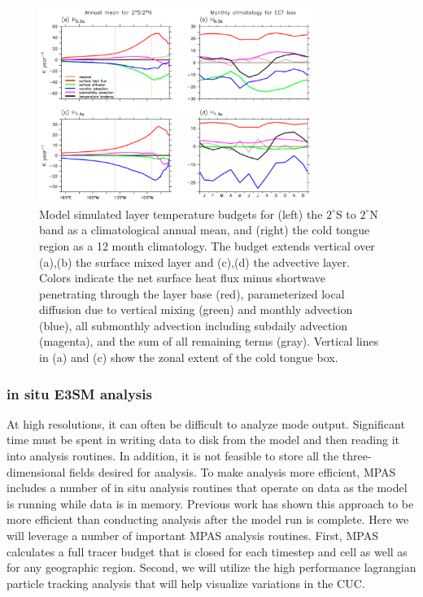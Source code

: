 \begin{figure}[h]
  \centering
  \includegraphics[width=0.8\textwidth]{heatBudget.pdf}
  \caption{Model simulated layer temperature budgets for (left) the $2^\circ$S to $2^\circ$N band as a climatological annual mean, and (right) the cold tongue region as a 12 month climatology.  The budget extends vertical over (a),(b) the surface mixed layer and (c),(d) the advective layer.  Colors indicate the net surface heat flux minus shortwave penetrating through the layer base (red), parameterized local diffusion due to vertical mixing (green) and monthly advection (blue), all submonthly advection including subdaily advection (magenta), and the sum of all remaining terms (gray).  Vertical lines in (a) and (c) show the zonal extent of the cold tongue box.}
  \label{fig:heatBudget}
\end{figure}

\subsubsection{in situ E3SM analysis}
At high resolutions, it can often be difficult to analyze mode output.  Significant time must be spent in writing data to disk from the model and then reading it into analysis routines.  In addition, it is not feasible to store all the three-dimensional fields desired for analysis.  To make analysis more efficient, MPAS includes a number of in situ analysis routines that operate on data as the model is running while data is in memory.  Previous work \citep{woodring2015situ} has shown this approach to be more efficient than conducting analysis after the model run is complete.  Here we will leverage a number of important MPAS analysis routines.  First, MPAS calculates a full tracer budget that is closed for each timestep and cell as well as for any geographic region.  Second, we will utilize the high performance lagrangian particle tracking analysis \citep{wolfram2015diagnosing} that will help visualize variations in the CUC.

